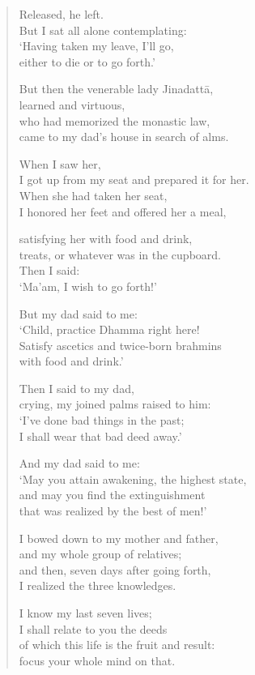 \documentclass[12pt,openany]{book}%
\begin{document}
\begin{verse}
Released, he left. \\
But I sat all alone contemplating: \\
‘Having taken my leave, I’ll go, \\
either to die or to go forth.’ 

But then the venerable lady \textsanskrit{Jinadattā}, \\
learned and virtuous, \\
who had memorized the monastic law, \\
came to my dad’s house in search of alms. 

When I saw her, \\
I got up from my seat and prepared it for her. \\
When she had taken her seat, \\
I honored her feet and offered her a meal, 

satisfying her with food and drink, \\
treats, or whatever was in the cupboard. \\
Then I said: \\
‘Ma’am, I wish to go forth!’ 

But my dad said to me: \\
‘Child, practice Dhamma right here! \\
Satisfy ascetics and twice-born brahmins \\
with food and drink.’ 

Then I said to my dad, \\
crying, my joined palms raised to him: \\
‘I’ve done bad things in the past; \\
I shall wear that bad deed away.’ 

And my dad said to me: \\
‘May you attain awakening, the highest state, \\
and may you find the extinguishment \\
that was realized by the best of men!’ 

I bowed down to my mother and father, \\
and my whole group of relatives; \\
and then, seven days after going forth, \\
I realized the three knowledges. 

I know my last seven lives; \\
I shall relate to you the deeds \\
of which this life is the fruit and result: \\
focus your whole mind on that. 


\end{verse}
\end{document}
